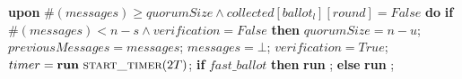 \begin{algorithm}
\begin{algorithmic}[1]
    \State     
    \State \textbf{upon} $\#(messages) \geq quorumSize \land collected[ballot_l][round] = False$ \textbf{do} 
        \State \hspace{\algorithmicindent} \textbf{if }{$\#(messages) < n-s \land verification = False$} \textbf{then}
            \State \hspace{\algorithmicindent}\hspace{\algorithmicindent} $quorumSize = n-u$;
            \State \hspace{\algorithmicindent}\hspace{\algorithmicindent}
            $previousMessages = messages$;
            \State \hspace{\algorithmicindent}\hspace{\algorithmicindent}
            $messages = \bot$;
            \State \hspace{\algorithmicindent}\hspace{\algorithmicindent} $verification = True$;
            \State \hspace{\algorithmicindent}\hspace{\algorithmicindent} $timer = \textbf{run}\ \Call{start\_timer}{2T}$;
            \State \hspace{\algorithmicindent}\hspace{\algorithmicindent} \textbf{if} $fast\_ballot$ \textbf{then}
            \State \hspace{\algorithmicindent}\hspace{\algorithmicindent}\hspace{\algorithmicindent} \textbf{run} ;
            \State\hspace{\algorithmicindent}\hspace{\algorithmicindent} \textbf{else}
            \State\hspace{\algorithmicindent}\hspace{\algorithmicindent}\hspace{\algorithmicindent} \textbf{run} ;
            

\end{algorithmic}
\end{algorithm}
